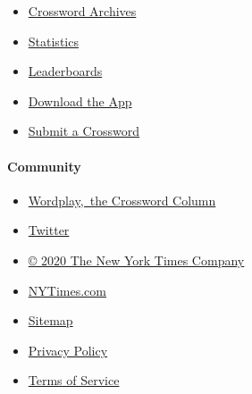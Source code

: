 \begin{itemize}
\tightlist
\item
  \href{/crosswords/archive}{Crossword Archives}
\item
  \href{/puzzles/stats}{Statistics}
\item
  \href{/puzzles/leaderboards}{Leaderboards}
\item
  \href{/crosswords/apps}{Download the App}
\item
  \href{/puzzles/submissions/crossword}{Submit a Crossword}
\end{itemize}

\hypertarget{community}{%
\paragraph{Community}\label{community}}

\begin{itemize}
\tightlist
\item
  \href{https://nytimes3xbfgragh.onion/column/wordplay}{Wordplay,~the
  Crossword Column}
\item
  \href{https://twitter.com/NYTimesWordplay}{Twitter}
\end{itemize}

\begin{itemize}
\tightlist
\item
  \href{https://www.nytco.com}{© 2020 The New York Times Company}
\item
  \href{https://www.nytimes3xbfgragh.onion}{NYTimes.com}
\item
  \href{https://spiderbites.nytimes3xbfgragh.onion}{Sitemap}
\item
  \href{https://www.nytimes3xbfgragh.onion/subscription/privacy-policy\#/privacy}{Privacy
  Policy}
\item
  \href{https://help.nytimes3xbfgragh.onion/hc/en-us/articles/115014893428-Terms-of-service}{Terms
  of Service}
\end{itemize}
